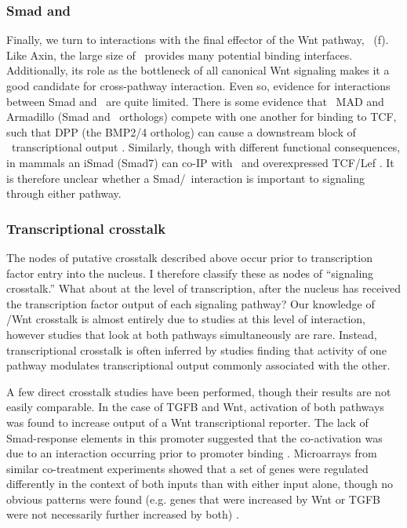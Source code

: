 \subsubsection{Smad and \bcat}
\label{pathways:wntTgfb:bcat}


Finally, we turn to interactions with the final effector of
the Wnt pathway, \bcat\ (f).
Like Axin, the large size of \bcat\ provides
many potential binding interfaces. Additionally, its role as the bottleneck
of all canonical Wnt signaling makes it a good candidate for
cross-pathway interaction. Even so, evidence for interactions between
Smad and \bcat\ are quite limited. There is some evidence that
\fly\ MAD and Armadillo (Smad and \bcat\ orthologs) compete with one another
for binding to TCF, such
that DPP (the BMP2/4 ortholog) can cause a downstream block of \bcat\ transcriptional output
\cite{Zeng2008}. Similarly, though with different functional consequences, in mammals
an iSmad (Smad7) can co-IP with \bcat\ and overexpressed TCF/Lef \cite{Edlund2005}.
It is therefore unclear whether a Smad/\bcat\ interaction is important to signaling
through either pathway.


  
\subsubsection{Transcriptional crosstalk}
\label{pathways:wntTgfb:transcription}


The nodes of putative crosstalk described above occur prior to transcription
factor entry into the nucleus. I therefore classify these as nodes of 
``signaling crosstalk.'' What about at the level of transcription,
after the nucleus has received the transcription factor output of each signaling pathway?
Our knowledge of \tgfbsf/Wnt crosstalk is almost entirely due to studies
at this level of interaction, however studies that look at both pathways
simultaneously are rare. Instead, transcriptional crosstalk is often inferred
by studies finding that activity of one pathway
modulates transcriptional output commonly associated with the other.


A few direct crosstalk studies have been performed, though their results
are not easily comparable.
In the case of TGFB and Wnt, activation of both pathways was found to
increase output of a Wnt transcriptional reporter. The lack of
Smad-response elements in this promoter suggested that
the co-activation was due to an interaction occurring prior to promoter
binding \cite{Warner2005,Lei2004}. Microarrays
from similar co-treatment experiments showed that a set of genes
were regulated differently in the context of both inputs than with either
input alone, though no obvious patterns were found (e.g. genes that
were increased by Wnt or TGFB were not necessarily further increased by both)
\cite{Warner2011,Labbe2007}.


